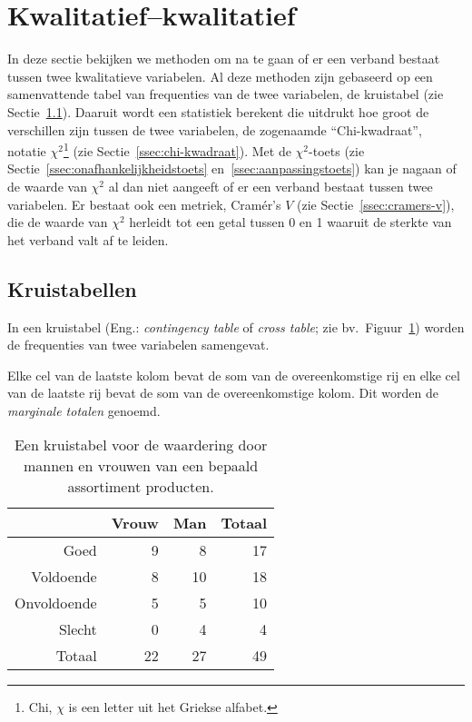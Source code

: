 \section{Kwalitatief--kwalitatief}
\label{sec:kwalitatief-kwalitatief}

In deze sectie bekijken we methoden om na te gaan of er een verband bestaat tussen twee kwalitatieve variabelen. Al deze methoden zijn gebaseerd op een samenvattende tabel van frequenties van de twee variabelen, de kruistabel (zie Sectie~\ref{ssec:kruistabellen}). Daaruit wordt een statistiek berekent die uitdrukt hoe groot de verschillen zijn tussen de twee variabelen, de zogenaamde ``Chi-kwadraat'', notatie $\chi^2$\footnote{Chi, $\chi$ is een letter uit het Griekse alfabet.} (zie Sectie~\ref{ssec:chi-kwadraat}). Met de $\chi^2$-toets (zie Sectie~\ref{ssec:onafhankelijkheidstoets} en~\ref{ssec:aanpassingstoets}) kan je nagaan of de waarde van $\chi^2$ al dan niet aangeeft of er een verband bestaat tussen twee variabelen. Er bestaat ook een metriek, Cramér's $V$ (zie Sectie~\ref{ssec:cramers-v}), die de waarde van $\chi^2$ herleidt tot een getal tussen 0 en 1 waaruit de sterkte van het verband valt af te leiden.

\subsection{Kruistabellen}
\label{ssec:kruistabellen}

\begin{definition}[Kruistabel]
  In een kruistabel (Eng.: \emph{contingency table} of \emph{cross table}; zie bv.~Figuur~\ref{tab:kruistabel0}) worden de frequenties van twee variabelen samengevat.
  
  Elke cel van de laatste kolom bevat de som van de overeenkomstige rij en elke cel van de laatste rij bevat de som van de overeenkomstige kolom. Dit worden de \emph{marginale totalen} genoemd.
\end{definition}

\begin{table} \centering
  \begin{tabular}{@{}rrrr}
    \toprule
                & Vrouw & Man & Totaal \\
    \midrule
           Goed &     9 &   8 &     17 \\
      Voldoende &     8 &  10 &     18 \\
    Onvoldoende &     5 &   5 &     10 \\
         Slecht &     0 &   4 &      4 \\
         Totaal &    22 &  27 &     49 \\
    \bottomrule
  \end{tabular}
  \caption{Een kruistabel voor de waardering door mannen en vrouwen van een bepaald assortiment producten.}
  \label{tab:kruistabel0}
\end{table}

